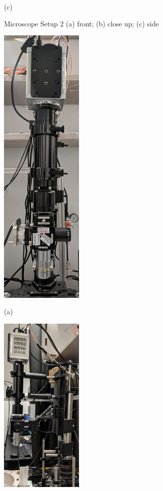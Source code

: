 \begin{figure}[htb]
\begin{minipage}[t]{\linewidth}
    \centerline{(c)}
  \end{minipage}
  \caption{Microscope Setup 2 (a) front; (b) close up; (c) side}
  \label{fig:motion sensors}
\end{figure}


\begin{figure}[htb]
  \begin{minipage}[t]{0.32\linewidth}\centering
    \includegraphics[width=4cm]{2_Body/Figures/setup4-front.jpg}
    \centerline{(a)}
  \end{minipage}\hfill
  \begin{minipage}[t]{0.32\linewidth}\centering
    \includegraphics[width=4cm]{2_Body/Figures/setup4-side.jpg}

\end{minipage}
\end{figure}
